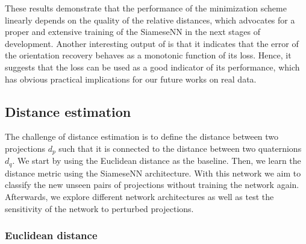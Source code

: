 These results demonstrate that the performance of the minimization scheme~ linearly depends on the quality of the relative distances, which advocates for a proper and extensive training of the SiameseNN in the next stages of development.
Another interesting output of  is that it indicates that the error of the orientation recovery behaves as a monotonic function of its loss.
Hence, it suggests that the loss can be used as a good indicator of its performance, which has obvious practical implications for our future works on real data.


\subsection{Distance estimation}\label{sec:results:distance-estimation}


The challenge of distance estimation is to define the distance between two projections $d_p$ such that it is connected to the distance between two quaternions $d_q$. We start by using the Euclidean distance as the baseline. Then, we learn the distance metric using the SiameseNN architecture. With this network we aim to classify the new unseen pairs of projections without training the network again. Afterwards, we explore different network architectures as well as test the sensitivity of the network to perturbed projections.



\subsubsection{Euclidean distance}\label{sec:results:distance-estimation:euclidean}


